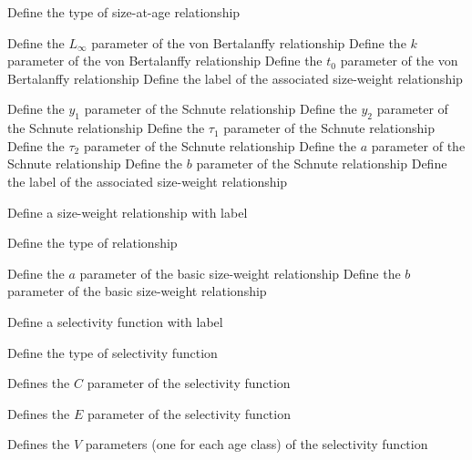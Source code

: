  {Define the type of size-at-age relationship}
\par\textbf{}\par
{} {Define the $L_\infty$ parameter of the von Bertalanffy relationship}
 {Define the $k$ parameter of the von Bertalanffy relationship}
 {Define the $t_0$ parameter of the von Bertalanffy relationship}
 {Define the label of the associated size-weight relationship}
\par\textbf{}\par
{} {Define the $y_1$ parameter of the Schnute relationship}
 {Define the $y_2$ parameter of the Schnute relationship}
 {Define the $\tau_1$ parameter of the Schnute relationship}
 {Define the $\tau_2$ parameter of the Schnute relationship}
 {Define the $a$ parameter of the Schnute relationship}
 {Define the $b$ parameter of the Schnute relationship}
 {Define the label of the associated size-weight relationship}
\par{} {Define a size-weight relationship with label}\par
{} {Define the type of relationship}
\par\textbf{}\par
\par\textbf{}\par
{} {Define the $a$ parameter of the basic size-weight relationship}
 {Define the $b$ parameter of the basic size-weight relationship}
\par{} {Define a selectivity function with label}\par
{} {Define the type of selectivity function}
\par\textbf{}\par
{} {Defines the $C$ parameter of the selectivity function}
\par\textbf{}\par
{} {Defines the $E$ parameter of the selectivity function}
\par\textbf{}\par
{} {Defines the $V$ parameters (one for each age class) of the selectivity function}
